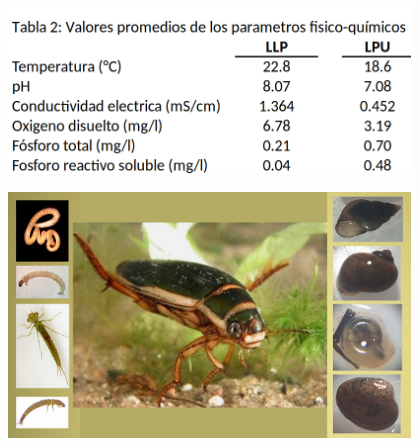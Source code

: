 \documentclass[final]{beamer}
\newlength{\sepmargin}
\newlength{\onecolwid}
\begin{document}
\begin{frame}[t]
\begin{columns}[t]
\begin{column}{\onecolwid}
				\begin{figure}
                  \includegraphics[width=.8\linewidth]{fq.png}
				\end{figure}
				
			
         \begin{block}{ }
                
                \begin{figure}
                    \includegraphics[width=0.45\linewidth]{popu2.jpg}
				\end{figure}
                
		\end{block}
      \end{column}
      
      \begin{column}{\sepmargin} \end{column}
      \end{columns} 
       

\end{frame}
\end{document}
